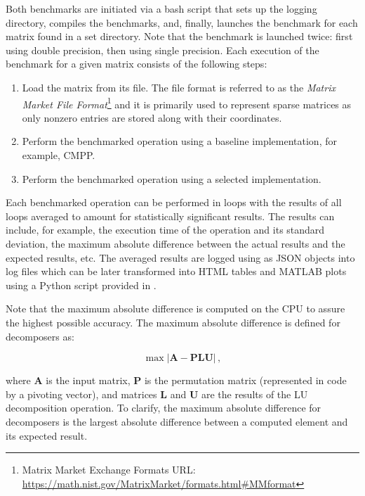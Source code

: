 Both benchmarks are initiated via a bash script that sets up the logging directory, compiles the benchmarks, and, finally, launches the benchmark for each matrix found in a set directory. Note that the benchmark is launched twice: first using double precision, then using single precision. Each execution of the benchmark for a given matrix consists of the following steps:

\begin{enumerate}
	\item Load the matrix from its  file. The  file format is referred to as the \textit{Matrix Market File Format}\footnote{Matrix Market Exchange Formats URL: \url{https://math.nist.gov/MatrixMarket/formats.html\#MMformat}} and it is primarily used to represent sparse matrices as only nonzero entries are stored along with their coordinates.
	\item \label{Item:implementation->decomposition-project->benchmarks->procedure->baseline-operation}
		Perform the benchmarked operation using a baseline implementation, for example, CMPP.
	\item \label{Item:implementation->decomposition-project->benchmarks->procedure->selected-operations}
		Perform the benchmarked operation using a selected implementation.
\end{enumerate}

Each benchmarked operation can be performed in loops with the results of all loops averaged to amount for statistically significant results. The results can include, for example, the execution time of the operation and its standard deviation, the maximum absolute difference between the actual results and the expected results, etc. The averaged results are logged using  as JSON objects into log files which can be later transformed into HTML tables and MATLAB plots using a Python script provided in .

Note that the maximum absolute difference is computed on the CPU to assure the highest possible accuracy. The maximum absolute difference is defined for decomposers as:

\begin{equation}
	\max \left| \mathbf{A} - \mathbf{PLU} \right| \,,
	\label{Equation:implementation->decomposition-project->benchmarks->decomposers->maximum-difference}
\end{equation}

where $\mathbf{A}$ is the input matrix, $\mathbf{P}$ is the permutation matrix (represented in code by a pivoting vector), and matrices $\mathbf{L}$ and $\mathbf{U}$ are the results of the LU decomposition operation. To clarify, the maximum absolute difference for decomposers is the largest absolute difference between a computed element and its expected result.

